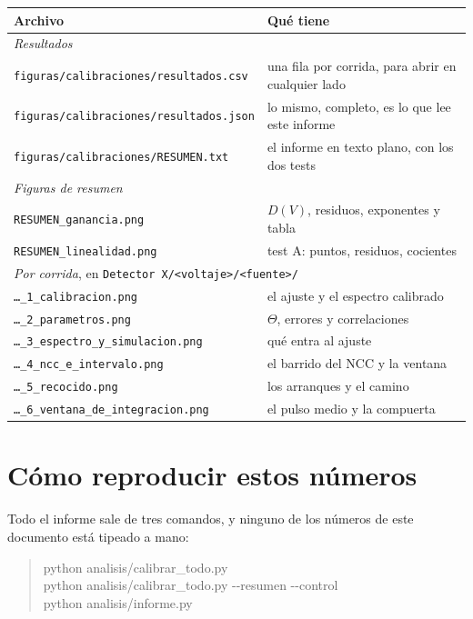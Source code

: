 \documentclass[11pt,a4paper]{article}
\begin{document}
\begin{center}
\begin{tabular}{ll}
\toprule
\textbf{Archivo} & \textbf{Qué tiene} \\
\midrule
\multicolumn{2}{l}{\textit{Resultados}} \\
\texttt{figuras/calibraciones/resultados.csv} &
   una fila por corrida, para abrir en cualquier lado \\
\texttt{figuras/calibraciones/resultados.json} &
   lo mismo, completo, es lo que lee este informe \\
\texttt{figuras/calibraciones/RESUMEN.txt} &
   el informe en texto plano, con los dos tests \\
\midrule
\multicolumn{2}{l}{\textit{Figuras de resumen}} \\
\texttt{RESUMEN\_ganancia.png} & $D(V)$, residuos, exponentes y tabla \\
\texttt{RESUMEN\_linealidad.png} & test A: puntos, residuos, cocientes \\
\midrule
\multicolumn{2}{l}{\textit{Por corrida}, en
   \texttt{Detector X/<voltaje>/<fuente>/}} \\
\texttt{\ldots\_1\_calibracion.png} & el ajuste y el espectro calibrado \\
\texttt{\ldots\_2\_parametros.png} & $\Theta$, errores y correlaciones \\
\texttt{\ldots\_3\_espectro\_y\_simulacion.png} & qué entra al ajuste \\
\texttt{\ldots\_4\_ncc\_e\_intervalo.png} & el barrido del NCC y la ventana \\
\texttt{\ldots\_5\_recocido.png} & los \NArranques{} arranques y el camino \\
\texttt{\ldots\_6\_ventana\_de\_integracion.png} &
   el pulso medio y la compuerta \\
\bottomrule
\end{tabular}
\end{center}

\section{Cómo reproducir estos números}
\label{ap:reproducir}

Todo el informe sale de tres comandos, y ninguno de los números de este
documento está tipeado a mano:

\begin{quote}\ttfamily\small
python analisis/calibrar\_todo.py \\
python analisis/calibrar\_todo.py -{}-resumen -{}-control \\
python analisis/informe.py
\end{quote}
\end{document}
